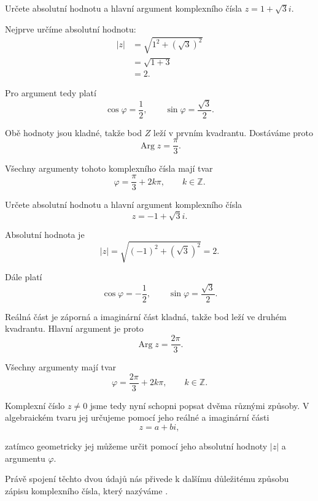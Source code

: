 \documentclass[12pt,a4paper]{article}
\begin{document}
\begin{examplebox}
    Určete absolutní hodnotu a hlavní argument komplexního čísla $z=1+\sqrt{3}i$.

    Nejprve určíme absolutní hodnotu:
    \begin{align*}
        |z| &= \sqrt{1^2+(\sqrt{3})^2}\\
            &= \sqrt{1+3}\\
            &= 2.
    \end{align*}

    Pro argument tedy platí
    \[
        \cos\varphi=\frac{1}{2}, \qquad \sin\varphi=\frac{\sqrt{3}}{2}.
    \]

    Obě hodnoty jsou kladné, takže bod $Z$ leží v prvním kvadrantu. Dostáváme proto
    \[
        \operatorname{Arg}z=\frac{\pi}{3}.
    \]

    Všechny argumenty tohoto komplexního čísla mají tvar
    \[
        \varphi=\frac{\pi}{3}+2k\pi, \qquad k\in\mathbb{Z}.
    \]
\end{examplebox}


\begin{examplebox}
    Určete absolutní hodnotu a hlavní argument komplexního čísla
    \[
        z=-1+\sqrt{3}i.
    \]

    Absolutní hodnota je
    \[
        |z| = \sqrt{(-1)^2+(\sqrt{3})^2} = 2.
    \]

    Dále platí
    \[
        \cos\varphi=-\frac{1}{2}, \qquad \sin\varphi=\frac{\sqrt{3}}{2}.
    \]

    Reálná část je záporná a imaginární část kladná, takže bod leží ve druhém kvadrantu. 
    Hlavní argument je proto
    \[
        \operatorname{Arg}z=\frac{2\pi}{3}.
    \]

    Všechny argumenty mají tvar
    \[
        \varphi=\frac{2\pi}{3}+2k\pi, \qquad k\in\mathbb{Z}.
    \]
\end{examplebox}


Komplexní číslo $z\neq0$ jsme tedy nyní schopni popsat dvěma různými způsoby.
V algebraickém tvaru jej určujeme pomocí jeho reálné a imaginární části
\[
    z=a+bi,
\]

zatímco geometricky jej můžeme určit pomocí jeho absolutní hodnoty $|z|$ a argumentu $\varphi$.

Právě spojení těchto dvou údajů nás přivede k dalšímu důležitému způsobu zápisu
komplexního čísla, který nazýváme .
\end{document}
